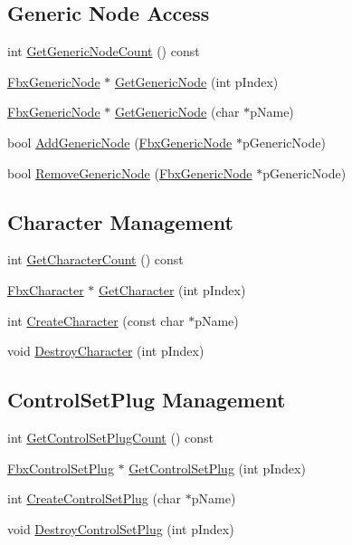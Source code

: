 \subsection*{Generic Node Access}
\begin{DoxyCompactItemize}
\item 
int \hyperlink{class_fbx_scene_affc3c8713672b7d0c3bf857a62cb400b}{Get\+Generic\+Node\+Count} () const
\item 
\hyperlink{class_fbx_generic_node}{Fbx\+Generic\+Node} $\ast$ \hyperlink{class_fbx_scene_abb58edd9139efcf577a2c910202fd842}{Get\+Generic\+Node} (int p\+Index)
\item 
\hyperlink{class_fbx_generic_node}{Fbx\+Generic\+Node} $\ast$ \hyperlink{class_fbx_scene_ad5a5ab95c93631d8c39acc39da689313}{Get\+Generic\+Node} (char $\ast$p\+Name)
\item 
bool \hyperlink{class_fbx_scene_aedfcc888eda10e083a10646875390d6d}{Add\+Generic\+Node} (\hyperlink{class_fbx_generic_node}{Fbx\+Generic\+Node} $\ast$p\+Generic\+Node)
\item 
bool \hyperlink{class_fbx_scene_ada01a14ed31636b615d6e95c1f33e2ca}{Remove\+Generic\+Node} (\hyperlink{class_fbx_generic_node}{Fbx\+Generic\+Node} $\ast$p\+Generic\+Node)
\end{DoxyCompactItemize}
\subsection*{Character Management}
\begin{DoxyCompactItemize}
\item 
int \hyperlink{class_fbx_scene_ab425b0d2df9318234ed67e7276ff823c}{Get\+Character\+Count} () const
\item 
\hyperlink{class_fbx_character}{Fbx\+Character} $\ast$ \hyperlink{class_fbx_scene_a1ac7e6cc72f3d3e89dcece88cb9e1fd3}{Get\+Character} (int p\+Index)
\item 
int \hyperlink{class_fbx_scene_a5095a3dbd1407bda6c12e5aa29f63049}{Create\+Character} (const char $\ast$p\+Name)
\item 
void \hyperlink{class_fbx_scene_ade61cc3b6e1e0fc8fbfb7d664b1d59b1}{Destroy\+Character} (int p\+Index)
\end{DoxyCompactItemize}
\subsection*{Control\+Set\+Plug Management}
\begin{DoxyCompactItemize}
\item 
int \hyperlink{class_fbx_scene_a03a1a3f0153d9aa882eaa9c550fd9127}{Get\+Control\+Set\+Plug\+Count} () const
\item 
\hyperlink{class_fbx_control_set_plug}{Fbx\+Control\+Set\+Plug} $\ast$ \hyperlink{class_fbx_scene_aaa152051d6af46baf4e56fc517d7fe19}{Get\+Control\+Set\+Plug} (int p\+Index)
\item 
int \hyperlink{class_fbx_scene_a1496eb0d5cdc26a33f1da631fbc1f047}{Create\+Control\+Set\+Plug} (char $\ast$p\+Name)
\item 
void \hyperlink{class_fbx_scene_a7175cf4e931920126c9c051abbb5a884}{Destroy\+Control\+Set\+Plug} (int p\+Index)
\end{DoxyCompactItemize}
